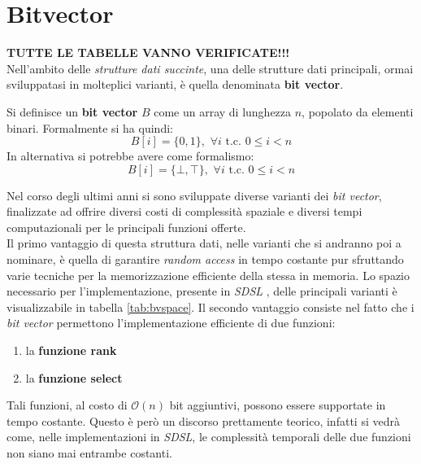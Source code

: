\section{Bitvector}
\label{bvsec}
\textbf{TUTTE LE TABELLE VANNO VERIFICATE!!!}\\
Nell'ambito delle \textit{strutture dati succinte}, una delle strutture dati
principali, ormai sviluppatasi in molteplici varianti, è quella denominata
\textbf{bit vector}.
\begin{definizione}
  Si definisce un \textbf{bit vector} $B$ come un array di lunghezza $n$,
  popolato da elementi binari. Formalmente si ha quindi:
  \[B[i]=\{0,1\},\,\,\forall i \mbox{ t.c. } 0\leq i < n\]
  In alternativa si potrebbe avere come formalismo:
  \[B[i]=\{\bot,\top\},\,\,\forall i \mbox{ t.c. } 0\leq i < n\]
\end{definizione}
Nel corso degli ultimi anni si sono sviluppate diverse varianti dei \textit{bit
  vector}, finalizzate ad offrire diversi costi di complessità spaziale e
diversi tempi computazionali per le principali funzioni offerte.\\
Il primo vantaggio di questa struttura dati, nelle varianti che si andranno poi
a nominare, è quella di garantire \textit{random access} in tempo costante pur
sfruttando varie tecniche per la memorizzazione efficiente della stessa in
memoria. Lo spazio necessario per l'implementazione, presente in
\textit{SDSL} \cite{sdsl}, delle principali varianti è visualizzabile in tabella
\ref{tab:bvspace}. Il secondo vantaggio consiste nel fatto che i \textit{bit
  vector} permettono l'implementazione efficiente di due funzioni:
\begin{enumerate}
  \item la \textbf{funzione rank}
  \item la \textbf{funzione select}
\end{enumerate}
Tali funzioni, al costo di $\mathcal{O}(n)$ bit aggiuntivi, possono essere
supportate in tempo costante. Questo è però un discorso prettamente teorico,
infatti si vedrà come, nelle implementazioni in \textit{SDSL}, le complessità
temporali delle due funzioni non siano mai entrambe costanti.
